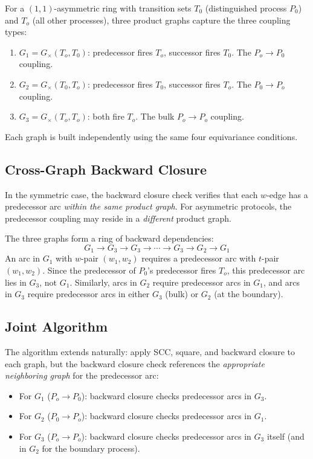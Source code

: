 \documentclass[11pt]{article}
\begin{document}
For a $(1,1)$-asymmetric ring with transition sets $T_0$ (distinguished process $P_0$) and $T_o$ (all other processes), three product graphs capture the three coupling types:

\begin{enumerate}[nosep]
\item $G_1 = G_\times(T_o, T_0)$: predecessor fires $T_o$, successor fires $T_0$. The $P_o \to P_0$ coupling.
\item $G_2 = G_\times(T_0, T_o)$: predecessor fires $T_0$, successor fires $T_o$. The $P_0 \to P_o$ coupling.
\item $G_3 = G_\times(T_o, T_o)$: both fire $T_o$. The bulk $P_o \to P_o$ coupling.
\end{enumerate}

Each graph is built independently using the same four equivariance conditions.

\subsection{Cross-Graph Backward Closure}

In the symmetric case, the backward closure check verifies that each $w$-edge has a predecessor arc \emph{within the same product graph}. For asymmetric protocols, the predecessor coupling may reside in a \emph{different} product graph.

The three graphs form a ring of backward dependencies:
\[
G_1 \to G_3 \to G_3 \to \cdots \to G_3 \to G_2 \to G_1
\]
An arc in $G_1$ with $w$-pair $(w_1, w_2)$ requires a predecessor arc with $t$-pair $(w_1, w_2)$. Since the predecessor of $P_0$'s predecessor fires $T_o$, this predecessor arc lies in $G_3$, not $G_1$. Similarly, arcs in $G_2$ require predecessor arcs in $G_1$, and arcs in $G_3$ require predecessor arcs in either $G_3$ (bulk) or $G_2$ (at the boundary).

\subsection{Joint Algorithm}

The algorithm extends naturally: apply SCC, square, and backward closure to each graph, but the backward closure check references the \emph{appropriate neighboring graph} for the predecessor arc:

\begin{itemize}[nosep]
\item For $G_1$ ($P_o \to P_0$): backward closure checks predecessor arcs in $G_3$.
\item For $G_2$ ($P_0 \to P_o$): backward closure checks predecessor arcs in $G_1$.
\item For $G_3$ ($P_o \to P_o$): backward closure checks predecessor arcs in $G_3$ itself (and in $G_2$ for the boundary process).
\end{itemize}
\end{document}
